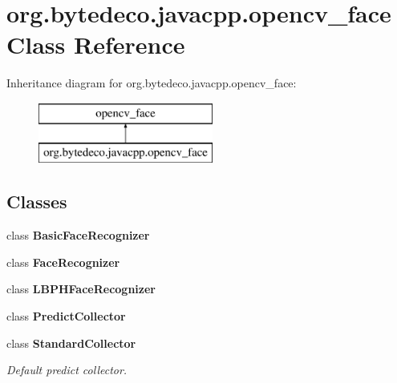 \hypertarget{classorg_1_1bytedeco_1_1javacpp_1_1opencv__face}{}\section{org.\+bytedeco.\+javacpp.\+opencv\+\_\+face Class Reference}
\label{classorg_1_1bytedeco_1_1javacpp_1_1opencv__face}
Inheritance diagram for org.\+bytedeco.\+javacpp.\+opencv\+\_\+face\+:\begin{figure}[H]
\begin{center}
\leavevmode
\includegraphics[height=2.000000cm]{classorg_1_1bytedeco_1_1javacpp_1_1opencv__face}
\end{center}
\end{figure}
\subsection*{Classes}
\begin{DoxyCompactItemize}
\item 
class {\bfseries Basic\+Face\+Recognizer}
\item 
class {\bfseries Face\+Recognizer}
\item 
class {\bfseries L\+B\+P\+H\+Face\+Recognizer}
\item 
class {\bfseries Predict\+Collector}
\item 
class {\bfseries Standard\+Collector}
\begin{DoxyCompactList}\small\item\em Default predict collector. \end{DoxyCompactList}\end{DoxyCompactItemize}
